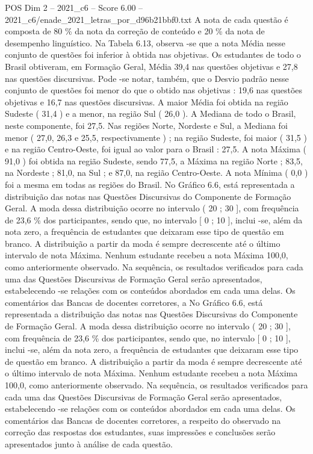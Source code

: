 \begin{textsample}{POS Dim 2 – 2021\_c6 – Score 6.00 – 2021\_c6/enade\_2021\_letras\_por\_d96b21bbf0.txt}
A nota de cada questão é composta de 80 \% da nota da correção de conteúdo e 20 \% da nota de desempenho linguístico.
Na Tabela 6.13, observa -se que a nota Média nesse conjunto de questões foi inferior à obtida nas objetivas.
Os estudantes de todo o Brasil obtiveram, em Formação Geral, Média 39,4 nas questões objetivas e 27,8 nas questões discursivas.
Pode -se notar, também, que o Desvio padrão nesse conjunto de questões foi menor do que o obtido nas objetivas : 19,6 nas questões objetivas e 16,7 nas questões discursivas.
A maior Média foi obtida na região Sudeste ( 31,4 ) e a menor, na região Sul ( 26,0 ).
A Mediana de todo o Brasil, neste componente, foi 27,5.
Nas regiões Norte, Nordeste e Sul, a Mediana foi menor ( 27,0, 26,3 e 25,5, respectivamente ) ; na região Sudeste, foi maior ( 31,5 ) e na região Centro-Oeste, foi igual ao valor para o Brasil : 27,5.
A nota Máxima ( 91,0 ) foi obtida na região Sudeste, sendo 77,5, a Máxima na região Norte ; 83,5, na Nordeste ; 81,0, na Sul ; e 87,0, na região Centro-Oeste.
A nota Mínima ( 0,0 ) foi a mesma em todas as regiões do Brasil.
No Gráfico 6.6, está representada a distribuição das notas nas Questões Discursivas do Componente de Formação Geral.
A moda dessa distribuição ocorre no intervalo ( 20 ; 30 ], com frequência de 23,6 \% dos participantes, sendo que, no intervalo [ 0 ; 10 ], inclui -se, além da nota zero, a frequência de estudantes que deixaram esse tipo de questão em branco.
A distribuição a partir da moda é sempre decrescente até o último intervalo de nota Máxima.
Nenhum estudante recebeu a nota Máxima 100,0, como anteriormente observado.
Na sequência, os resultados verificados para cada uma das Questões Discursivas de Formação Geral serão apresentados, estabelecendo -se relações com os conteúdos abordados em cada uma delas.
Os comentários das Bancas de docentes corretores, a No Gráfico 6.6, está representada a distribuição das notas nas Questões Discursivas do Componente de Formação Geral.
A moda dessa distribuição ocorre no intervalo ( 20 ; 30 ], com frequência de 23,6 \% dos participantes, sendo que, no intervalo [ 0 ; 10 ], inclui -se, além da nota zero, a frequência de estudantes que deixaram esse tipo de questão em branco.
A distribuição a partir da moda é sempre decrescente até o último intervalo de nota Máxima.
Nenhum estudante recebeu a nota Máxima 100,0, como anteriormente observado.
Na sequência, os resultados verificados para cada uma das Questões Discursivas de Formação Geral serão apresentados, estabelecendo -se relações com os conteúdos abordados em cada uma delas.
Os comentários das Bancas de docentes corretores, a respeito do observado na correção das respostas dos estudantes, suas impressões e conclusões serão apresentados junto à análise de cada questão.

\end{textsample}
